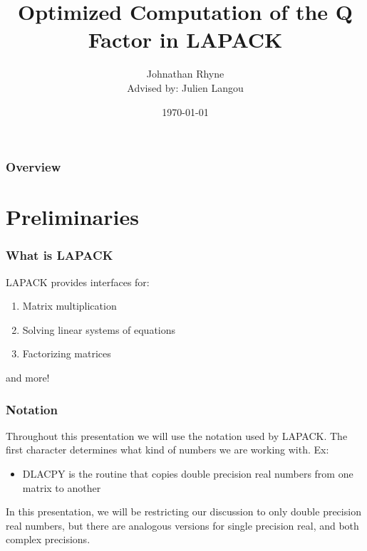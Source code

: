 \documentclass[12pt,aspectratio=169]{beamer}
\title{Optimized Computation of the Q Factor in LAPACK}
\author{Johnathan Rhyne\\Advised by: Julien Langou}
\institute{University of Colorado Denver}
\date{\today}
\begin{document}
    \begin{frame}
        \titlepage
    \end{frame}
    \begin{framefont}{\small}
    \begin{frame}
        \frametitle{Overview}
        \begin{multicols}{2}
            \tableofcontents
        \end{multicols}
    \end{frame}
    \end{framefont}
    \section{Preliminaries}
    \begin{frame}
        \frametitle{What is LAPACK}
        LAPACK provides interfaces for:
        \begin{enumerate}
            \item Matrix multiplication
            \item Solving linear systems of equations
            \item Factorizing matrices
        \end{enumerate}
        and more!
    \end{frame}
    \begin{frame}
        \frametitle{Notation}
        Throughout this presentation we will use the notation used by LAPACK. The first character determines what kind of numbers we are working with. Ex:
        \begin{itemize}
            \item DLACPY is the routine that copies double precision real numbers from one matrix to another
        \end{itemize}
        In this presentation, we will be restricting our discussion to only double precision real numbers,
        but there are analogous versions for single precision real, and both complex precisions.
    \end{frame}
\end{document}
